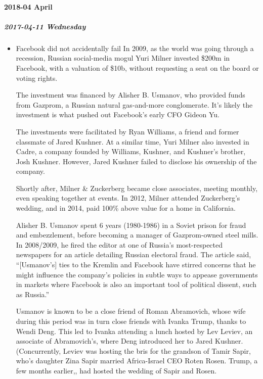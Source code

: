 \documentclass[11pt]{article}
\begin{document}
\paragraph*{2018-04 April}
\label{sec:orgbfd4053}
\startcontents[level-4]
\subparagraph*{2017-04-11 Wednesday}
\label{sec:org21e0c87}
\begin{itemize}
\item Facebook did not accidentally fail
\label{sec:orgd76da9f}
In 2009, as the world was going through a recession, Russian social-media mogul Yuri Milner invested \$200m in Facebook, with a valuation of \$10b, without requesting a seat on the board or voting rights.

The investment was financed by Alisher B. Usmanov, who provided funds from Gazprom, a Russian natural gas-and-more conglomerate. It’s likely the investment is what pushed out Facebook’s early CFO Gideon Yu.

The investments were facilitated by Ryan Williams, a friend and former classmate of Jared Kushner. At a similar time, Yuri Milner also invested in Cadre, a company founded by Williams, Kushner, and Kushner’s brother, Josh Kushner. However, Jared Kushner failed to disclose his ownership of the company.

Shortly after, Milner \& Zuckerberg became close associates, meeting monthly, even speaking together at events. In 2012, Milner attended Zuckerberg’s wedding, and in 2014, paid 100\% above value for a home in California.

Alisher B. Usmanov spent 6 years (1980-1986) in a Soviet prison for fraud and embezzlement, before becoming a manager of Gazprom-owned steel mills. In 2008/2009, he fired the editor at one of Russia’s most-respected newspapers for an article detailing Russian electoral fraud. The article said, “[Usmanov’s] ties to the Kremlin and Facebook have stirred concerns that he might influence the company’s policies in subtle ways to appease governments in markets where Facebook is also an important tool of political dissent, such as Russia.”

Usmanov is known to be a close friend of Roman Abramovich, whose wife during this period was in turn close friends with Ivanka Trump, thanks to Wendi Deng. This led to Ivanka attending a lunch hosted by Lev Leviev, an associate of Abramovich’s, where Deng introduced her to Jared Kushner. (Concurrently, Leviev was hosting the bris for the grandson of Tamir Sapir, who’s daughter Zina Sapir married Africa-Israel CEO Roten Rosen. Trump, a few months earlier,, had hosted the wedding of Sapir and Rosen.


\end{itemize}
\end{document}
